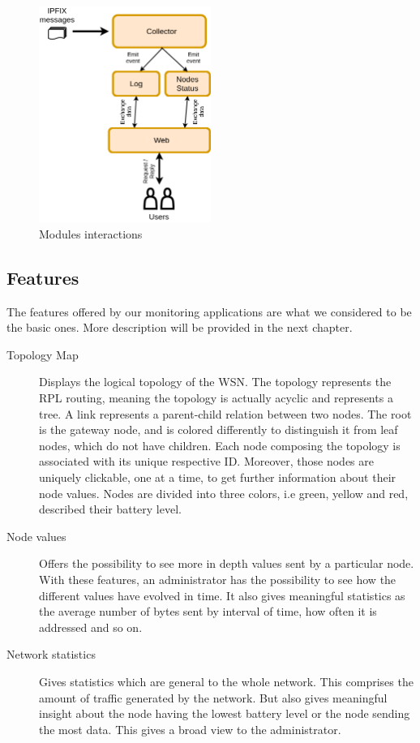 \begin{figure}
	\centering
	\includegraphics[width=0.5\textwidth]{res/modules.png}
	\caption{Modules interactions}
	\label{fig:modules}
\end{figure}

\subsection{Features}

The features offered by our monitoring applications are what we considered to be the basic ones. More description will be provided in the next chapter.

\begin{description}
	\item[Topology Map] Displays the logical topology of the WSN. The topology represents the RPL routing, meaning the topology is actually acyclic and represents a tree. A link represents a parent-child relation between two nodes. The root is the gateway node, and is colored differently to distinguish it from leaf nodes, which do not have children. Each node composing the topology is associated with its unique respective ID. Moreover, those nodes are uniquely clickable, one at a time, to get further information about their node values. Nodes are divided into three colors, i.e green, yellow and red, described their battery level.
	\item[Node values] Offers the possibility to see more in depth values sent by a particular node. With these features, an administrator has the possibility to see how the different values have evolved in time. It also gives meaningful statistics as the average number of bytes sent by interval of time, how often it is addressed and so on.
	\item[Network statistics] Gives statistics which are general to the whole network. This comprises the amount of traffic generated by the network. But also gives meaningful insight about the node having the lowest battery level or the node sending the most data. This gives a broad view to the administrator.
\end{description}

